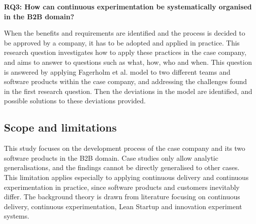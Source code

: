 \documentclass[english]{tktltiki2}
\theoremstyle{definition}
\theoremstyle{remark}
\begin{document}


\noindent \textbf{RQ3: How can continuous experimentation be systematically organised in the B2B domain?}

\noindent When the benefits and requirements are identified and the process is decided to be approved by a company, it has to be adopted and applied in practice. This research question investigates how to apply these practices in the case company, and aims to answer to questions such as what, how, who and when. This question is answered by applying Fagerholm et al. model \cite{fagerholm2014building} to two different teams and software products within the case company, and addressing the challenges found in the first research question. Then the deviations in the model are identified, and possible solutions to these deviations provided. \newline

\subsection{Scope and limitations}
This study focuses on the development process of the case company and its two software products in the B2B domain. Case studies only allow analytic generalisations, and the findings cannot be directly generalised to other cases. This limitation applies especially to applying continuous delivery and continuous experimentation in practice, since software products and customers inevitably differ. The background theory is drawn from literature focusing on continuous delivery, continuous experimentation, Lean Startup and innovation experiment systems. 
\end{document}
